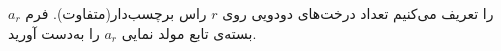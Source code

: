     \p 
$a_r$
را تعریف می‌کنیم تعداد درخت‌های دودویی روی
$r$
راس برچسب‌دار(متفاوت). فرم بسته‌ی تابع مولد نمایی
$a_r$
را به‌دست آورید.